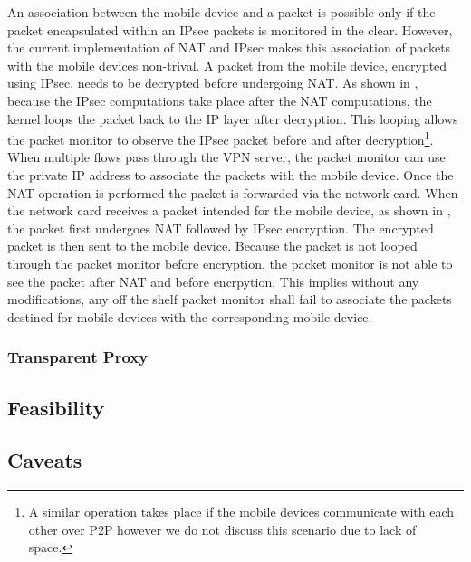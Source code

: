 An association between the mobile device and a packet is possible only
if the packet encapsulated within an IPsec packets is monitored in the
clear.  However, the current implementation of NAT and IPsec makes
this association of packets with the mobile devices non-trival.  A
packet from the mobile device, encrypted using IPsec, needs to be
decrypted before undergoing NAT.  As shown in
, because the IPsec computations
take place after the NAT computations, the kernel loops the packet
back to the IP layer after decryption.  This looping allows the packet
monitor to observe the IPsec packet before and after
decryption\footnote{A similar operation takes place if the mobile
  devices communicate with each other over P2P however we do not
  discuss this scenario due to lack of space.}.  When multiple flows
pass through the VPN server, the packet monitor can use the private IP
address to associate the packets with the mobile device.  Once the NAT
operation is performed the packet is forwarded via the network card.
When the network card receives a packet intended for the mobile
device, as shown in , the packet
first undergoes NAT followed by IPsec encryption.  The encrypted
packet is then sent to the mobile device.  Because the packet is not
looped through the packet monitor before encryption, the packet
monitor is not able to see the packet after NAT and before encrpytion.
This implies without any modifications, any off the shelf packet
monitor shall fail to associate the packets destined for mobile
devices with the corresponding mobile device.



\subsubsection{Transparent Proxy}
\label{sec:platform-transparent-proxy}


\subsection{Feasibility}


\subsection{Caveats}

